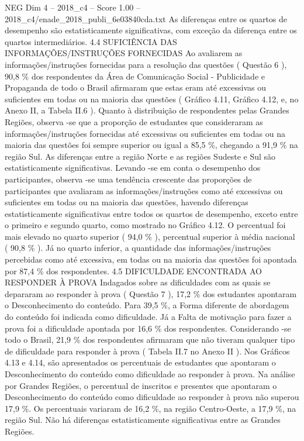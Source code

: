\begin{textsample}{NEG Dim 4 – 2018\_c4 – Score 1.00 – 2018\_c4/enade\_2018\_publi\_6e03840cda.txt}
As diferenças entre os quartos de desempenho são estatisticamente significativas, com exceção da diferença entre os quartos intermediários. 4.4 SUFICIÊNCIA DAS INFORMAÇÕES/INSTRUÇÕES FORNECIDAS Ao avaliarem as informações/instruções fornecidas para a resolução das questões ( Questão 6 ), 90,8 \% dos respondentes da Área de Comunicação Social - Publicidade e Propaganda de todo o Brasil afirmaram que estas eram até excessivas ou suficientes em todas ou na maioria das questões ( Gráfico 4.11, Gráfico 4.12, e, no Anexo II, a Tabela II.6 ).
Quanto à distribuição de respondentes pelas Grandes Regiões, observa -se que a proporção de estudantes que consideraram as informações/instruções fornecidas até excessivas ou suficientes em todas ou na maioria das questões foi sempre superior ou igual a 85,5 \%, chegando a 91,9 \% na região Sul.
As diferenças entre a região Norte e as regiões Sudeste e Sul são estatisticamente significativas.
Levando -se em conta o desempenho dos participantes, observa -se uma tendência crescente das proporções de participantes que avaliaram as informações/instruções como até excessivas ou suficientes em todas ou na maioria das questões, havendo diferenças estatisticamente significativas entre todos os quartos de desempenho, exceto entre o primeiro e segundo quarto, como mostrado no Gráfico 4.12.
O percentual foi mais elevado no quarto superior ( 94,0 \% ), percentual superior à média nacional ( 90,8 \% ).
Já no quarto inferior, a quantidade das informações/instruções percebidas como até excessiva, em todas ou na maioria das questões foi apontada por 87,4 \% dos respondentes. 4.5 DIFICULDADE ENCONTRADA AO RESPONDER À PROVA Indagados sobre as dificuldades com as quais se depararam ao responder à prova ( Questão 7 ), 17,2 \% dos estudantes apontaram o Desconhecimento do conteúdo.
Para 39,5 \%, a Forma diferente de abordagem do conteúdo foi indicada como dificuldade.
Já a Falta de motivação para fazer a prova foi a dificuldade apontada por 16,6 \% dos respondentes.
Considerando -se todo o Brasil, 21,9 \% dos respondentes afirmaram que não tiveram qualquer tipo de dificuldade para responder à prova ( Tabela II.7 no Anexo II ).
Nos Gráficos 4.13 e 4.14, são apresentados os percentuais de estudantes que apontaram o Desconhecimento do conteúdo como dificuldade ao responder à prova.
Na análise por Grandes Regiões, o percentual de inscritos e presentes que apontaram o Desconhecimento do conteúdo como dificuldade ao responder à prova não superou 17,9 \%.
Os percentuais variaram de 16,2 \%, na região Centro-Oeste, a 17,9 \%, na região Sul.
Não há diferenças estatisticamente significativas entre as Grandes Regiões.

\end{textsample}
